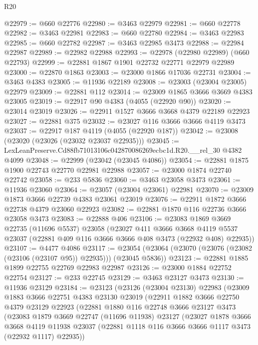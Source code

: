 \begin{lexlean}{R20}
\begin{coremodule}
@22979 := @660 @22776
@22980 := @3463 @22979
@22981 := @660 @22778
@22982 := @3463 @22981
@22983 := @660 @22780
@22984 := @3463 @22983
@22985 := @660 @22782
@22987 := @3463 @22985 @3473
@22988 := @22984 @22987
@22989 := @22982 @22988
@22993 := @22978 (@22980 @22989) (@660 @22793)
@22999 := @22881 @1867 @1901 @22732 @22771 @22979 @22989
@23000 := @22870 @1863
@23003 := @23000 @1866 @17036 @22731
@23004 := @3463 @4383
@23005 := @11936 @22189
@23008 := @23003 (@23004 @23005) @22979
@23009 := @22881 @112
@23014 := @23009 @1865 @3666 @3669 @4383 @23005
@23019 := @22917 @90 @4383 (@4055 (@22920 @90))
@23020 := @23014 @23019
@23026 := @22911 @1527 @3666 @3668 @4379 @22189 @22923
@23027 := @22881 @375
@23032 := @23027 @116 @3666 @3666 @4119 @3473
@23037 := @22917 @187 @4119 (@4055 (@22920 @187))
@23042 := @23008 (@23020 (@23026 (@23032 @23037 @22935)))
@23045 := LexLeanPreserve.Cd88fb71013106c042870086269ecbc1d.R20.__rel_30 @4382 @4099
@23048 := @22999 (@23042 (@23045 @4086))
@23054 := @22881 @1875 @1900 @22743 @22770 @22981 @22988
@23057 := @23000 @1874 @22740 @22742
@23058 := @233 @5836
@23060 := @3463 @23058 @3473
@23061 := @11936 @23060
@23064 := @23057 (@23004 @23061) @22981
@23070 := @23009 @1873 @3666 @22739 @4383 @23061 @23019
@23076 := @22911 @1872 @3666 @22738 @4379 @23060 @22923
@23082 := @22881 @1870 @116 @22736 @3666 @23058 @3473
@23083 := @22888 @406
@23106 := @23083
    @1869
    @3669
    @22735
    (@11696 @5537)
    @23058
    (@23027
      @411
      @3666
      @3668
      @4119
      @5537
      @23037
      (@22881 @409 @116 @3666 @3666 @408 @3473 (@22932 @408) @22935))
@23107 := @4477 @4086
@23117 := @23054 (@23064 (@23070 (@23076 (@23082 (@23106 (@23107 @95)) @22935))) (@23045 @5836))
@23123 := @22881 @1885 @1899 @22755 @22769 @22983 @22987
@23126 := @23000 @1884 @22752 @22754
@23127 := @233 @22745
@23129 := @3463 @23127 @3473
@23130 := @11936 @23129
@23184 := @23123
    (@23126
      (@23004 @23130)
      @22983
      (@23009
        @1883
        @3666
        @22751
        @4383
        @23130
        @23019
        (@22911
          @1882
          @3666
          @22750
          @4379
          @23129
          @22923
          (@22881
            @1880
            @116
            @22748
            @3666
            @23127
            @3473
            (@23083
              @1879
              @3669
              @22747
              (@11696 @11938)
              @23127
              (@23027
                @1878
                @3666
                @3668
                @4119
                @11938
                @23037
                (@22881 @1118 @116 @3666 @3666 @1117 @3473 (@22932 @1117) @22935))

\end{coremodule}
\end{lexlean}
